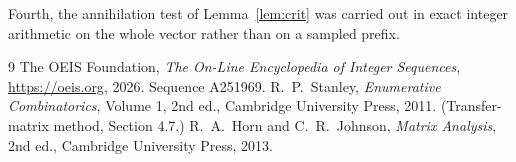 \documentclass[11pt,a4paper]{article}
\theoremstyle{plain}
\theoremstyle{definition}
\begin{document}
Fourth, the annihilation test of Lemma~\ref{lem:crit} was carried out in exact integer
arithmetic on the whole vector rather than on a sampled prefix.

\begin{thebibliography}{9}
 The OEIS Foundation, \emph{The On-Line Encyclopedia of Integer
Sequences}, \url{https://oeis.org}, 2026. Sequence A251969.
 R.~P.~Stanley, \emph{Enumerative Combinatorics}, Volume 1, 2nd ed.,
Cambridge University Press, 2011. (Transfer-matrix method, Section 4.7.)
 R.~A.~Horn and C.~R.~Johnson, \emph{Matrix Analysis}, 2nd ed., Cambridge
University Press, 2013.
\end{thebibliography}
\end{document}
